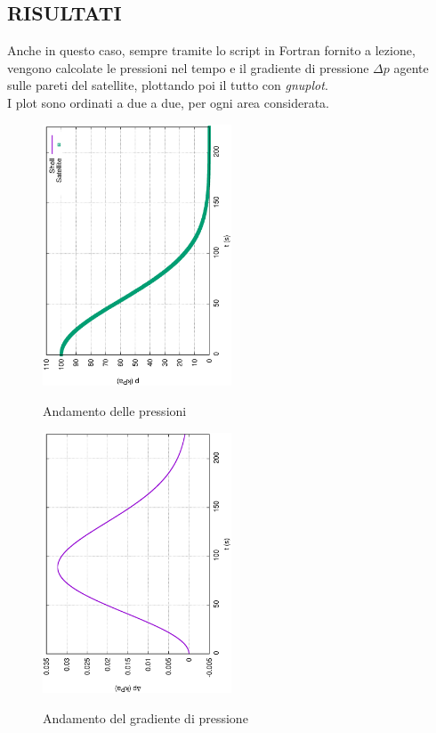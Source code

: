 \documentclass{article}
\begin{document}
        \subsection{RISULTATI\label{Esercizio2_risultati}}
        Anche in questo caso, sempre tramite lo script in Fortran fornito a lezione, 
        vengono calcolate le pressioni nel tempo e il gradiente di pressione $\Delta p$ agente sulle pareti
        del satellite, plottando poi il tutto con \textit{gnuplot}.\\ 
        I plot sono ordinati a due a due, per ogni area considerata.
        
        \begin{figure}[h!]
            \centering
            \includegraphics[width=0.5\textwidth, angle=-90]{MUL2/Esercitazione1/2A/p.eps}
            \label{fig:press_10_5}
            \caption{Andamento delle pressioni} 
        \end{figure}

        \begin{figure}[h!]
            \centering
            \includegraphics[width=0.5\textwidth, angle=-90]{MUL2/Esercitazione1/2A/Dp.eps}
            \label{fig:grad_press_10_5}
            \caption{Andamento del gradiente di pressione}
        \end{figure}
\end{document}
